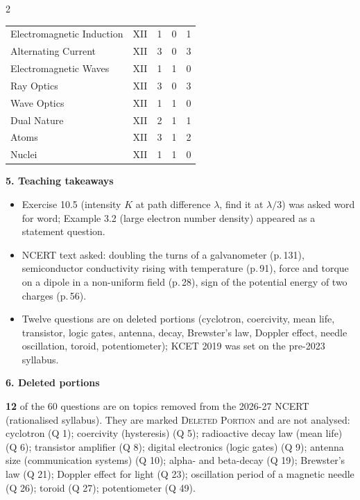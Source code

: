 \begin{multicols}{2}
{\begin{tabular}{@{}p{4.7cm}c@{\,}r@{\,}r@{\,}r@{}}
Electromagnetic Induction & XII & 1 & 0 & 1\\
Alternating Current & XII & 3 & 0 & 3\\
Electromagnetic Waves & XII & 1 & 1 & 0\\
Ray Optics & XII & 3 & 0 & 3\\
Wave Optics & XII & 1 & 1 & 0\\
Dual Nature & XII & 2 & 1 & 1\\
Atoms & XII & 3 & 1 & 2\\
Nuclei & XII & 1 & 1 & 0\\
\bottomrule\end{tabular}}\par\medskip
\textbf{\color{crimson}5. Teaching takeaways}\par\smallskip
{\footnotesize\begin{itemize}[leftmargin=1em,nosep]
\item Exercise 10.5 (intensity $K$ at path difference $\lambda$, find it at $\lambda/3$) was asked word for word; Example 3.2 (large electron number density) appeared as a statement question.
\item NCERT text asked: doubling the turns of a galvanometer (p.\,131), semiconductor conductivity rising with temperature (p.\,91), force and torque on a dipole in a non-uniform field (p.\,28), sign of the potential energy of two charges (p.\,56).
\item Twelve questions are on deleted portions (cyclotron, coercivity, mean life, transistor, logic gates, antenna, decay, Brewster's law, Doppler effect, needle oscillation, toroid, potentiometer); KCET 2019 was set on the pre-2023 syllabus.
\end{itemize}}\par\medskip
\textbf{\color{crimson}6. Deleted portions}\par\smallskip
\textbf{12} of the 60 questions are on topics removed from the 2026-27 NCERT (rationalised syllabus). They are marked \textsc{Deleted Portion} and are not analysed: cyclotron (Q 1); coercivity (hysteresis) (Q 5); radioactive decay law (mean life) (Q 6); transistor amplifier (Q 8); digital electronics (logic gates) (Q 9); antenna size (communication systems) (Q 10); alpha- and beta-decay (Q 19); Brewster's law (Q 21); Doppler effect for light (Q 23); oscillation period of a magnetic needle (Q 26); toroid (Q 27); potentiometer (Q 49).\par
\end{multicols}








